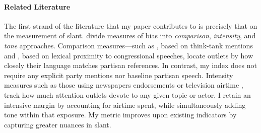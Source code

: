 \documentclass[12pt]{article}
\begin{document}

\paragraph{Related Literature}


The first strand of the literature that my paper contributes to is precisely that on the measurement of slant. \citet{puglisi_review} divide measures of bias into  \textit{comparison},  \textit{intensity}, and  \textit{tone} approaches. Comparison measures—such as \citet{milyo_measure}, based on think-tank mentions and \citet{gentzkow2010media}, based on lexical proximity to congressional speeches, locate outlets by how closely their language matches partisan references. In contrast, my index  does not require any explicit party mentions nor baseline partisan speech. Intensity measures such as those using newspapers endorsements \citep{ChiangKnight2011} or television airtime \citep{durante2012partisan,CageHengelHerveUrvoy2022}, track how much attention outlets devote to any given topic or actor. I retain an intensive margin by accounting for airtime spent, while simultaneously adding tone within that exposure. My metric improves upon existing indicators by capturing greater nuances in slant. 
\end{document}
